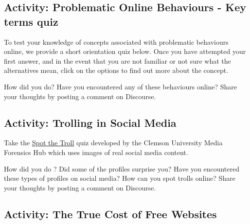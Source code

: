 \documentclass[
]{book}
\theoremstyle{definition}
\theoremstyle{definition}
\theoremstyle{definition}
\theoremstyle{definition}
\theoremstyle{remark}
\begin{document}
\hypertarget{activity-problematic-online-behaviours---key-terms-quiz}{%
\subsection*{Activity: Problematic Online Behaviours - Key terms quiz}\label{activity-problematic-online-behaviours---key-terms-quiz}}

\begin{reflect}
To test your knowledge of concepts associated with problematic behaviours online, we provide a short orientation quiz below. Once you have attempted your first answer, and in the event that you are not familiar or not sure what the alternatives mean, click on the options to find out more about the concept.

How did you do? Have you encountered any of these behaviours online? Share your thoughts by posting a comment on Discourse.
\end{reflect}

\hypertarget{activity-trolling-in-social-media}{%
\subsection*{Activity: Trolling in Social Media}\label{activity-trolling-in-social-media}}

\begin{reflect}
Take the \href{https://spotthetroll.org/}{Spot the Troll} quiz developed by the Clemson University Media Forensics Hub which uses images of real social media content.

How did you do ? Did some of the profiles surprise you? Have you encountered these types of profiles on social media? How can you spot trolls online? Share your thoughts by posting a comment on Discourse.
\end{reflect}

\hypertarget{activity-the-true-cost-of-free-websites}{%
\subsection*{Activity: The True Cost of Free Websites}\label{activity-the-true-cost-of-free-websites}}
\end{document}
